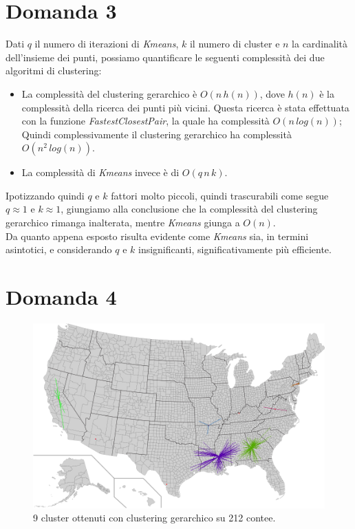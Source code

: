 \documentclass{article}
\begin{document}
\section*{Domanda 3}
Dati $q$ il numero di iterazioni di \textit{Kmeans}, $k$ il numero di cluster e $n$ la cardinalità dell'insieme dei punti, possiamo quantificare le seguenti complessità dei due algoritmi di clustering:
\begin{itemize}
	\item La complessità del clustering gerarchico è $O(n\,h(n))$, dove $h(n)$ è la complessità della ricerca dei punti più vicini.
	      Questa ricerca è stata effettuata con la funzione \textit{FastestClosestPair}, la quale ha complessità $O(n\,log(n))$;
	      Quindi complessivamente il clustering gerarchico ha complessità $O(n^2\,log(n))$.
	\item La complessità di \textit{Kmeans} invece è di $O(q\,n\,k)$. 
\end{itemize}

\noindent Ipotizzando quindi $q$ e $k$ fattori molto piccoli, quindi trascurabili come segue $q \approx 1$ e $k \approx 1$, giungiamo alla conclusione che 
la complessità del clustering gerarchico rimanga inalterata, mentre \textit{Kmeans} giunga a $O(n)$.\\
Da quanto appena esposto risulta evidente come \textit{Kmeans} sia, in termini asintotici, e considerando $q$ e $k$ insignificanti, significativamente più efficiente.

\section*{Domanda 4}
\begin{center}
	\begin{figure}[H]
		\hspace*{1.5cm}\includegraphics[width=0.8\linewidth, valign=t]{figures/Domanda4}
		\caption*{9 cluster ottenuti con clustering gerarchico su 212 contee.}
										
	\end{figure}
\end{center}
\end{document}
